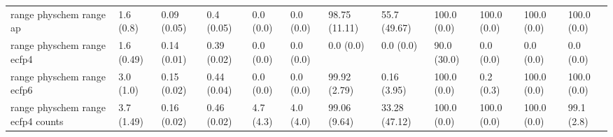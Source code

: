 \begin{tabular}{llllllllllll}
range physchem range ap & {\cellcolor[HTML]{F5FBFC}} \color[HTML]{000000} 1.6 (0.8) & {\cellcolor[HTML]{F7FCFD}} \color[HTML]{000000} 0.09 (0.05) & {\cellcolor[HTML]{56BA91}} \color[HTML]{F1F1F1} 0.4 (0.05) & {\cellcolor[HTML]{F7FCFD}} \color[HTML]{000000} 0.0 (0.0) & {\cellcolor[HTML]{F7FCFD}} \color[HTML]{000000} 0.0 (0.0) & {\cellcolor[HTML]{00481D}} \color[HTML]{F1F1F1} 98.75 (11.11) & {\cellcolor[HTML]{55B98F}} \color[HTML]{F1F1F1} 55.7 (49.67) & {\cellcolor[HTML]{00441B}} \color[HTML]{F1F1F1} 100.0 (0.0) & {\cellcolor[HTML]{00441B}} \color[HTML]{F1F1F1} 100.0 (0.0) & {\cellcolor[HTML]{00441B}} \color[HTML]{F1F1F1} 100.0 (0.0) & {\cellcolor[HTML]{B8E4DB}} \color[HTML]{000000} 100.0 (0.0) \\
range physchem range ecfp4 & {\cellcolor[HTML]{F5FBFC}} \color[HTML]{000000} 1.6 (0.49) & {\cellcolor[HTML]{F7FCFD}} \color[HTML]{000000} 0.14 (0.01) & {\cellcolor[HTML]{8FD4C2}} \color[HTML]{000000} 0.39 (0.02) & {\cellcolor[HTML]{F7FCFD}} \color[HTML]{000000} 0.0 (0.0) & {\cellcolor[HTML]{F7FCFD}} \color[HTML]{000000} 0.0 (0.0) & {\cellcolor[HTML]{F7FCFD}} \color[HTML]{000000} 0.0 (0.0) & {\cellcolor[HTML]{F7FCFD}} \color[HTML]{000000} 0.0 (0.0) & {\cellcolor[HTML]{00441B}} \color[HTML]{F1F1F1} 90.0 (30.0) & {\cellcolor[HTML]{00441B}} \color[HTML]{F1F1F1} 0.0 (0.0) & {\cellcolor[HTML]{00441B}} \color[HTML]{F1F1F1} 0.0 (0.0) & {\cellcolor[HTML]{00471C}} \color[HTML]{F1F1F1} 0.0 (0.0) \\
range physchem range ecfp6 & {\cellcolor[HTML]{F3FAFC}} \color[HTML]{000000} 3.0 (1.0) & {\cellcolor[HTML]{F4FBFC}} \color[HTML]{000000} 0.15 (0.02) & {\cellcolor[HTML]{5ABB95}} \color[HTML]{F1F1F1} 0.44 (0.04) & {\cellcolor[HTML]{F7FCFD}} \color[HTML]{000000} 0.0 (0.0) & {\cellcolor[HTML]{F7FCFD}} \color[HTML]{000000} 0.0 (0.0) & {\cellcolor[HTML]{00441B}} \color[HTML]{F1F1F1} 99.92 (2.79) & {\cellcolor[HTML]{F7FCFD}} \color[HTML]{000000} 0.16 (3.95) & {\cellcolor[HTML]{00441B}} \color[HTML]{F1F1F1} 100.0 (0.0) & {\cellcolor[HTML]{00441B}} \color[HTML]{F1F1F1} 0.2 (0.3) & {\cellcolor[HTML]{00441B}} \color[HTML]{F1F1F1} 100.0 (0.0) & {\cellcolor[HTML]{18823D}} \color[HTML]{F1F1F1} 100.0 (0.0) \\
range physchem range ecfp4 counts & {\cellcolor[HTML]{F2FAFC}} \color[HTML]{000000} 3.7 (1.49) & {\cellcolor[HTML]{E6F5F9}} \color[HTML]{000000} 0.16 (0.02) & {\cellcolor[HTML]{70C6AC}} \color[HTML]{000000} 0.46 (0.02) & {\cellcolor[HTML]{F7FCFD}} \color[HTML]{000000} 4.7 (4.3) & {\cellcolor[HTML]{F7FCFD}} \color[HTML]{000000} 4.0 (4.0) & {\cellcolor[HTML]{00471C}} \color[HTML]{F1F1F1} 99.06 (9.64) & {\cellcolor[HTML]{AADFD3}} \color[HTML]{000000} 33.28 (47.12) & {\cellcolor[HTML]{00441B}} \color[HTML]{F1F1F1} 100.0 (0.0) & {\cellcolor[HTML]{00441B}} \color[HTML]{F1F1F1} 100.0 (0.0) & {\cellcolor[HTML]{00441B}} \color[HTML]{F1F1F1} 100.0 (0.0) & {\cellcolor[HTML]{00441B}} \color[HTML]{F1F1F1} 99.1 (2.8) \\

\end{tabular}
